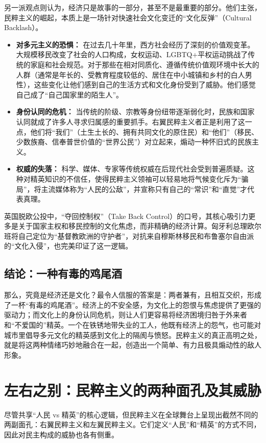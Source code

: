 \documentclass[a5paper, 11pt, openany]{ctexbook}
\begin{document}
另一派观点则认为，经济只是故事的一部分，甚至不是最重要的部分。他们主张，民粹主义的崛起，本质上是一场针对快速社会文化变迁的“文化反弹”（Cultural Backlash）。
\begin{itemize}
    \item \textbf{对多元主义的恐惧：} 在过去几十年里，西方社会经历了深刻的价值观变革。大规模移民改变了社会的人口构成，女权运动、LGBTQ+平权运动挑战了传统的家庭和社会规范。对于那些在相对同质化、遵循传统价值观环境中长大的人群（通常是年长的、受教育程度较低的、居住在中小城镇和乡村的白人男性），这些变化让他们感到自己的生活方式和文化身份受到了威胁。他们感觉自己成了“自己国家里的陌生人”。
    \item \textbf{身份认同的危机：} 当传统的阶级、宗教等身份纽带逐渐弱化时，民族和国家认同就成了许多人寻求归属感的重要抓手。右翼民粹主义者正是利用了这一点，他们将“我们”（土生土长的、拥有共同文化的原住民）和“他们”（移民、少数族裔、信奉普世价值的“世界公民”）对立起来，煽动一种怀旧式的民族主义。
    \item \textbf{权威的失落：} 科学、媒体、专家等传统权威在后现代社会受到普遍质疑。这种对精英知识的不信任，使得民粹主义领袖可以轻易地将气候变化斥为“骗局”，将主流媒体称为“人民的公敌”，并宣称只有自己的“常识”和“直觉”才代表真理。
\end{itemize}

英国脱欧公投中，“夺回控制权”（Take Back Control）的口号，其核心吸引力更多是关于国家主权和移民控制的文化焦虑，而非精确的经济计算。匈牙利总理欧尔班将自己定位为“基督教欧洲的守护者”，对抗来自穆斯林移民和布鲁塞尔自由派的“文化入侵”，也完美印证了这一逻辑。

\subsection{结论：一种有毒的鸡尾酒}

那么，究竟是经济还是文化？最令人信服的答案是：两者兼有，且相互交织，形成了一杯“有毒的鸡尾酒”。经济上的不安全感，为文化上的怨恨与焦虑提供了更强的驱动力；而文化上的身份认同危机，则让人们更容易将经济困境归咎于外来者和“不爱国的”精英。一个在铁锈地带失业的工人，他既有经济上的怨气，也可能对城市里倡导多元文化的精英感到文化上的隔阂与愤怒。民粹主义的真正高明之处，就是将这两种情绪巧妙地融合在一起，创造出一个简单、有力且极具煽动性的敌人形象。

\section{左右之别：民粹主义的两种面孔及其威胁}

尽管共享“人民 vs 精英”的核心逻辑，但民粹主义在全球舞台上呈现出截然不同的两副面孔：右翼民粹主义和左翼民粹主义。它们定义“人民”和“精英”的方式不同，因此对民主构成的威胁也各有侧重。
\end{document}
